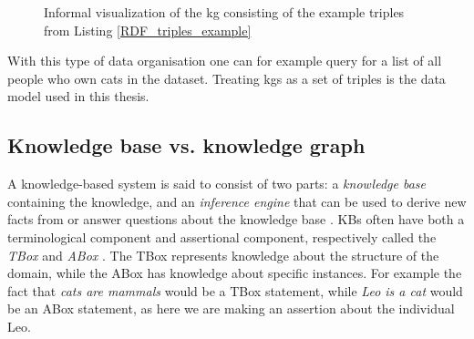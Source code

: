 \begin{figure}[htbp]
\centering
{}

\caption[Visualization of RDF triple example in listing \ref{RDF_triples_example}]{Informal visualization of the \gls{kg} consisting of the example triples from Listing \ref{RDF_triples_example}} \label{fig:KG_example_2}
\end{figure}

With this type of data organisation one can for example query for a list of all people who own cats in the dataset. Treating \glspl{kg} as a set of triples is the data model used in this thesis.


\subsection{Knowledge base vs. knowledge graph}
A knowledge-based system is said to consist of two parts: a \textit{knowledge base} containing the knowledge, and an \textit{inference engine} that can be used to derive new facts from or answer questions about the knowledge base \cite{akerkar2009knowledge}. KBs often have both a terminological component and assertional component, respectively called the \textit{TBox} and \textit{ABox} \cite{brachman1989overview}. The TBox represents knowledge about the structure of the domain, while the ABox has knowledge about specific instances. For example the fact that \emph{cats are  mammals} would be a TBox statement, while \emph{Leo is a cat} would be an ABox statement, as here we are making an assertion about the individual Leo.

